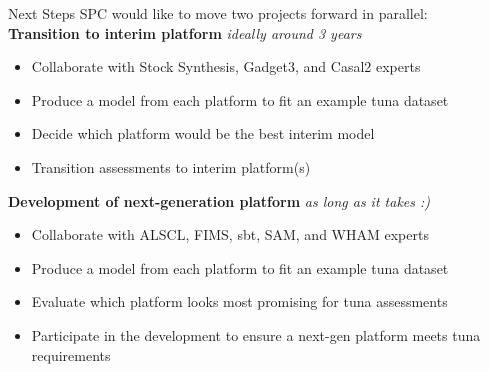 \documentclass[aspectratio=169,fleqn]{beamer}
\begin{document}

\begin{frame}{Next Steps}\small
  SPC would like to move two projects forward in parallel:\\[3ex]
  \textbf{\green Transition to interim platform}
  \gray\qquad\it ideally around 3 years\\[-0.5ex]
  \begin{itemize}
    \item[] Collaborate with Stock Synthesis, Gadget3, and Casal2
    experts\\[-1ex]
    \item[] Produce a model from each platform to fit an example tuna
    dataset\\[-1ex]
    \item[] Decide which platform would be the best interim model\\[-1ex]
    \item[] Transition assessments to interim platform(s)\\[3ex]
  \end{itemize}
  \textbf{\orange Development of next-generation platform}
  \gray\qquad\it as long as it takes :)\\[-0.5ex]
  \begin{itemize}
    \item[] Collaborate with ALSCL, FIMS, sbt, SAM, and WHAM experts\\[-1ex]
    \item[] Produce a model from each platform to fit an example tuna
    dataset\\[-1ex]
    \item[] Evaluate which platform looks most promising for tuna
    assessments\\[-1ex]
    \item[] Participate in the development to ensure a next-gen platform meets
    tuna requirements\\[2ex]
  \end{itemize}
\end{frame}

\end{document}
